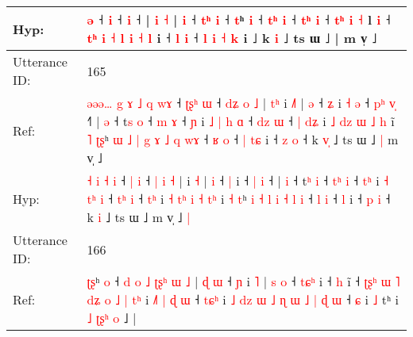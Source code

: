 \documentclass[10pt]{article}
\DeclareRobustCommand{\hl}[1]{{\textcolor{red}{#1}}}
\begin{document}
\begin{longtable}{ll}
 \\
Hyp: & \hl{}\hl{}\hl{ə} ˧\hl{}\hl{}\hl{} \hl{}\hl{i} ˧\hl{}\hl{}\hl{}\hl{} \hl{i} ˧\hl{}\hl{}\hl{}\hl{}\hl{}\hl{}\hl{} |\hl{}\hl{}\hl{}\hl{}\hl{}\hl{}\hl{}\hl{} \hl{i} \hl{˧} | \hl{i} ˧\hl{}\hl{} \hl{}\hl{t}\hl{ʰ} \hl{i} ˧ \hl{t}ʰ \hl{}\hl{i} ˧\hl{} \hl{}\hl{t}\hl{ʰ} \hl{i} ˧ \hl{t}\hl{ʰ} \hl{i} ˧ \hl{}\hl{}\hl{t}\hl{ʰ} \hl{i} \hl{˧} l \hl{i} ˧ \hl{t}\hl{ʰ} \hl{i} \hl{˧} \hl{l} \hl{i} \hl{˧} \hl{l} i ˧ \hl{}\hl{l} \hl{}\hl{i} ˧ \hl{l} \hl{i} \hl{˧} \hl{}\hl{k} i ˩ k \hl{}\hl{i} ˩ ts ɯ ˩ | m v̩ ˩\hl{}\hl{}
 \\
\midrule
Utterance ID: & 165 \\
Ref: & \hl{ə}\hl{ə}\hl{ə}\hl{…}\hl{ }\hl{g}\hl{ }\hl{ɤ} \hl{˩} \hl{q} \hl{w}\hl{ɤ} ˧ \hl{ʈ}\hl{ʂ}\hl{ʰ} \hl{ɯ} ˧ \hl{d}\hl{ʑ} \hl{o} \hl{˩} |\hl{ }\hl{t}\hl{ʰ} i \hl{˩}\hl{˥} | \hl{ə} ˧ \hl{ʑ} i\hl{ }\hl{˧}\hl{ }\hl{ə} ˧ \hl{p}\hl{ʰ} \hl{v}\hl{̩} ˧\hl{˥} | \hl{ə} ˧ t\hl{s} \hl{o} ˧ \hl{}\hl{m} \hl{ɤ} ˧ \hl{}\hl{ɲ} i \hl{˩} \hl{|}\hl{ }\hl{h} \hl{ɑ} ˧ \hl{d}\hl{z} \hl{ɯ} ˧\hl{ }\hl{|} \hl{d}\hl{ʑ} i \hl{˩} \hl{d}\hl{z} \hl{ɯ} \hl{˩} \hl{}\hl{h} i\hl{̃} \hl{˥} \hl{ʈ}\hl{ʂ}ʰ\hl{ }\hl{ɯ} \hl{˩} \hl{|} \hl{g} \hl{ɤ} \hl{˩} \hl{q} \hl{w}\hl{ɤ} ˧ \hl{ʁ} \hl{o} ˧\hl{ }\hl{|} \hl{t}\hl{ɕ} i ˧ \hl{z} \hl{o} ˧ k \hl{v}\hl{̩} ˩ ts ɯ ˩\hl{ }\hl{|} m v̩ ˩\hl{}\hl{}
 \\
Hyp: & \hl{}\hl{}\hl{}\hl{}\hl{}\hl{}\hl{}\hl{˧} \hl{i} \hl{˧} \hl{}\hl{i} ˧ \hl{}\hl{}\hl{|} \hl{i} ˧ \hl{}\hl{|} \hl{i} \hl{˧} |\hl{}\hl{}\hl{} i \hl{}\hl{˧} | \hl{i} ˧ \hl{|} i\hl{}\hl{}\hl{}\hl{} ˧ \hl{}\hl{|} \hl{}\hl{i} ˧\hl{} | \hl{i} ˧ t\hl{ʰ} \hl{i} ˧ \hl{t}\hl{ʰ} \hl{i} ˧ \hl{t}\hl{ʰ} i \hl{˧} \hl{}\hl{t}\hl{ʰ} \hl{i} ˧ \hl{t}\hl{ʰ} \hl{i} ˧\hl{}\hl{} \hl{t}\hl{ʰ} i \hl{˧} \hl{t}\hl{ʰ} \hl{i} \hl{˧} \hl{t}\hl{ʰ} i\hl{} \hl{˧} \hl{}\hl{t}ʰ\hl{}\hl{} \hl{i} \hl{˧} \hl{l} \hl{i} \hl{˧} \hl{l} \hl{}\hl{i} ˧ \hl{l} \hl{i} ˧\hl{}\hl{} \hl{}\hl{l} i ˧ \hl{p} \hl{i} ˧ k \hl{}\hl{i} ˩ ts ɯ ˩\hl{}\hl{} m v̩ ˩\hl{ }\hl{|}
 \\
\midrule
Utterance ID: & 166 \\
Ref: & \hl{ʈ}\hl{ʂ}ʰ\hl{ }\hl{o} ˧\hl{ }\hl{d}\hl{ }\hl{o} \hl{˩} \hl{ʈ}\hl{ʂ}\hl{ʰ} \hl{ɯ} \hl{˩} |\hl{ }\hl{ɖ} \hl{ɯ} ˧ \hl{ɲ} i \hl{˥} |\hl{ }\hl{s} \hl{o} ˧ \hl{t}\hl{ɕ}\hl{ʰ} i ˧ \hl{h} i\hl{̃} ˧\hl{ }\hl{ʈ}\hl{ʂ}\hl{ʰ} \hl{ɯ} \hl{˥} \hl{d}\hl{ʑ} \hl{o} \hl{˩} \hl{|} \hl{t}\hl{ʰ} i\hl{ }\hl{˩}\hl{˥} \hl{|} \hl{ɖ} \hl{ɯ} ˧ \hl{t}\hl{ɕ}\hl{ʰ} i\hl{ }\hl{˩} \hl{d}\hl{z} \hl{ɯ} \hl{˩} \hl{ɳ} \hl{ɯ} \hl{˩} \hl{|} \hl{ɖ} \hl{ɯ} ˧ \hl{ɕ} i \hl{˩} tʰ i \hl{˩} \hl{ʈ}\hl{ʂ}\hl{ʰ} \hl{o} ˩ |

\end{longtable}
\end{document}
